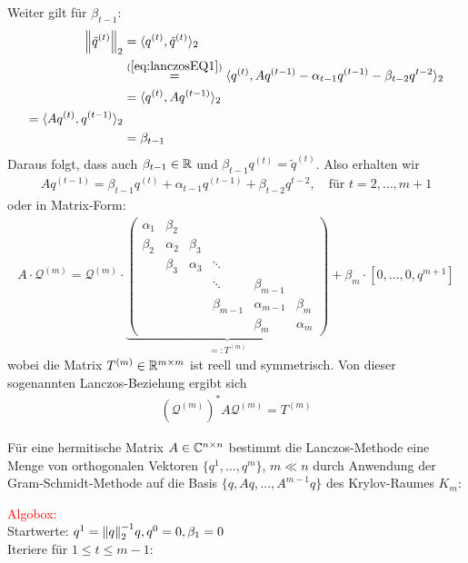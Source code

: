 Weiter gilt für $\beta_{t-1}$:
%
\begin{align*}
  \vertn{2}{\tilde{q}^{(t)}}_2 
  &= \langle q^{(t)}, \tilde{q}^{(t)}\rangle_2 \\
  &\stackrel{(\ref{eq:lanczosEQ1})}{=} \langle q^{(t)}, Aq^{(t-1)}-\alpha_{t-1}q^{(t-1)}-\beta_{t-2}q^{t-2}\rangle_2 \\
  &= \langle q^{(t)}, Aq^{(t-1)}\rangle_2 \\
  = \langle Aq^{(t)}, q^{(t-1)}\rangle_2 \\
  &= \beta_{t-1}
\end{align*}
%
Daraus folgt, dass auch $\beta_{t-1}\in\mathbb R$ und $\beta_{t-1}q^{(t)} = \tilde{q}^{(t)}$. Also erhalten wir 
\begin{align*}
  Aq^{(t-1)} = \beta_{t-1}q^{(t)} + \alpha_{t-1}q^{(t-1)} + \beta_{t-2}q^{t-2},\quad\text{für } t=2,\dots,m+1
\end{align*}
%
oder in Matrix-Form:
%
\begin{align*}A\cdot \mathcal{Q}^{(m)} = \mathcal{Q}^{(m)}\cdot\underbrace{
  \begin{pmatrix}
    \alpha_1 & \beta_2 & & & & \\
    \beta_2 & \alpha_2 & \beta_3 & & & \\
    & \beta_3 & \alpha_3 & \ddots & & \\
    & & & \ddots & \beta_{m-1} & \\
    & & & \beta_{m-1} & \alpha_{m-1} & \beta_m \\
    & & & & \beta_m & \alpha_m
  \end{pmatrix}}_{=:T^{(m)}} + \beta_m\cdot[0,\dots,0,q^{m+1}]
\end{align*}
%
wobei die Matrix $T^{(m)}\in\mathbb R^{m\times m}$ ist reell und symmetrisch. Von dieser sogenannten Lanczos-Beziehung
ergibt sich
%
\begin{align*}
  (\mathcal{Q}^{(m)})^* A \mathcal{Q}^{(m)} = T^{(m)}
\end{align*} 
%
\begin{defbox}
  Für eine hermitische Matrix $A\in\mathbb C  ^{n\times n}$ bestimmt die Lanczos-Methode eine Menge von orthogonalen 
  Vektoren $\{q^1,\dots,q^m\}$, $m\ll n$ durch Anwendung der Gram-Schmidt-Methode auf die Basis 
  $\{q,Aq,\dots,A^{m-1}q\}$ des Krylov-Raumes $K_m$:
\end{defbox}
\textcolor{red}{Algobox:} \\
Startwerte: $q^1=\vertn{2}{q}_2^{-1}q, q^0=0, \beta_1=0$ \\
Iteriere für $1\leq t\leq m-1$:
